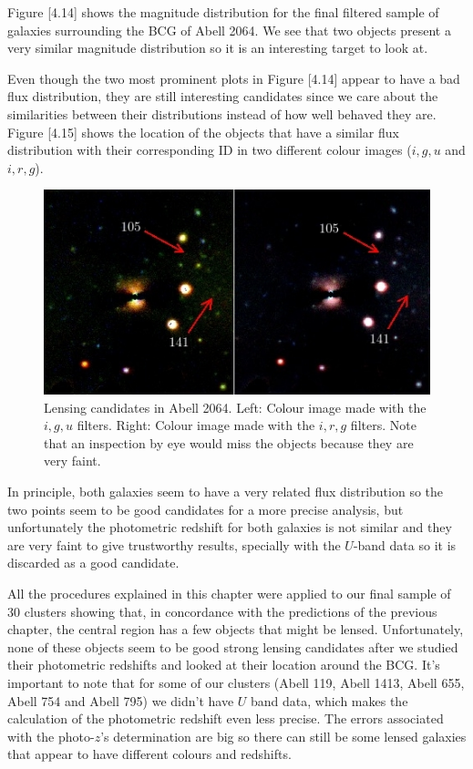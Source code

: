 Figure [4.14] shows the magnitude distribution for the final filtered sample of galaxies surrounding the BCG of Abell 2064. We see that two objects present a very similar magnitude distribution so it is an interesting target to look at. 

Even though the two most prominent plots in Figure [4.14] appear to have a bad flux distribution, they are still interesting candidates since we care about the similarities between their distributions instead of how well behaved they are. Figure [4.15] shows the location of the objects that have a similar flux distribution with their corresponding ID in two different colour images ($i,g,u$ and $i,r,g$).

\begin{figure}[H]
\centering
\includegraphics[width=15cm]{images/candidates.jpg}
\caption[Lensing candidates Abell 2064]{Lensing candidates in Abell 2064. Left: Colour image made with the $i,g,u$ filters. Right: Colour image made with the $i,r,g$ filters. Note that an inspection by eye would miss the objects because they are very faint.}
\end{figure}

In principle, both galaxies seem to have a very related flux distribution so the two points seem to be good candidates for a more precise analysis, but unfortunately the photometric redshift for both galaxies is not similar and they are very faint to give trustworthy results, specially with the $U$-band data so it is discarded as a good candidate.

All the procedures explained in this chapter were applied to our final sample of 30 clusters showing that, in concordance with the predictions of the previous chapter, the central region has a few objects that might be lensed. Unfortunately, none of these objects seem to be good strong lensing candidates after we studied their photometric redshifts and looked at their location around the BCG. It's important to note that for some of our clusters (Abell 119, Abell 1413, Abell 655, Abell 754 and Abell 795) we didn't have $U$ band data, which makes the calculation of the photometric redshift even less precise. The errors associated with the photo-$z$'s determination are big so there can still be some lensed galaxies that appear to have different colours and redshifts.


